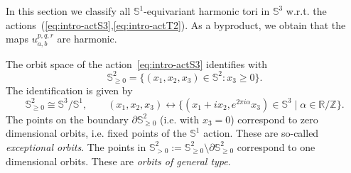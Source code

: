 \documentclass{amsart}
\let\ge\geqslant
\theoremstyle{plain}
\theoremstyle{definition}
\theoremstyle{remark}
\begin{document}
In this section we classify all \(\mathbb S^1\)-equivariant harmonic tori in
\(\mathbb S^3\) w.r.t. the actions~(\ref{eq:intro-actS3},\ref{eq:intro-actT2}).
As a byproduct, we obtain that the maps \(u_{a,b}^{p,q,r}\) are harmonic.

The orbit space of the action~\eqref{eq:intro-actS3} identifies with
\[
\mathbb S_{\ge 0}^2=\{(x_1,x_2,x_3)\in\mathbb S^2\colon x_3\ge 0\}.
\]
The identification is given by
\[
\mathbb S_{\ge 0}^2\cong\mathbb S^3/\mathbb S^1,\qquad
(x_1,x_2,x_3)\leftrightarrow
\{(x_1+ix_2,e^{2\pi i\alpha}x_3)\in\mathbb S^3\mid
\alpha\in\mathbb R/\mathbb Z\}.
\]
The points on the boundary \(\partial\mathbb S_{\ge 0}^2\) (i.e. with \(x_3=0\))
correspond to zero dimensional orbits, i.e. fixed points of the \(\mathbb S^1\)
action. These are so-called \emph{exceptional orbits}. The points in \(\mathbb
S_{>0}^2:=\mathbb S_{\ge 0}^2\setminus\partial\mathbb S_{\ge 0}^2\) correspond
to one dimensional orbits. These are \emph{orbits of general type}.
\end{document}
